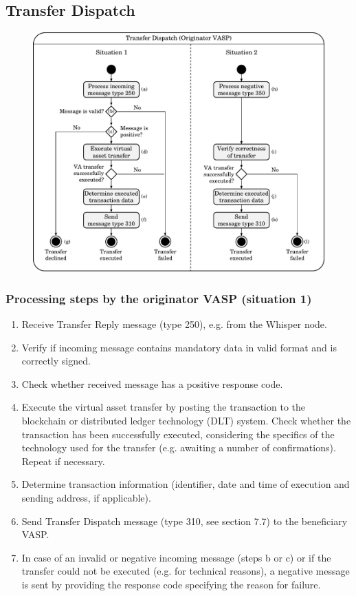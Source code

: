 \documentclass{article}
\begin{document}
\subsection{Transfer Dispatch}
\begin{figure}[h]
    \centering
    \includegraphics[width=\textwidth]{g13.pdf}
\end{figure}
\subsubsection{Processing steps by the originator VASP (situation 1)}
\begin{enumerate}
    \item Receive Transfer Reply message (type 250), e.g. from the Whisper node.
    \item Verify if incoming message contains mandatory data in valid format and is correctly signed.
    \item Check whether received message has a positive response code.
    \item Execute the virtual asset transfer by posting the transaction to the blockchain or distributed ledger technology (DLT) system. Check whether the transaction has been successfully executed, considering the specifics of the technology used for the transfer (e.g. awaiting a number of confirmations). Repeat if necessary.
    \item Determine transaction information (identifier, date and time of execution and sending address, if applicable).
    \item Send Transfer Dispatch message (type 310, see section 7.7) to the beneficiary VASP.
    \item In case of an invalid or negative incoming message (steps b or c) or if the transfer could not be executed (e.g. for technical reasons), a negative message is sent by providing the response code specifying the reason for failure.
\end{enumerate}
\end{document}
